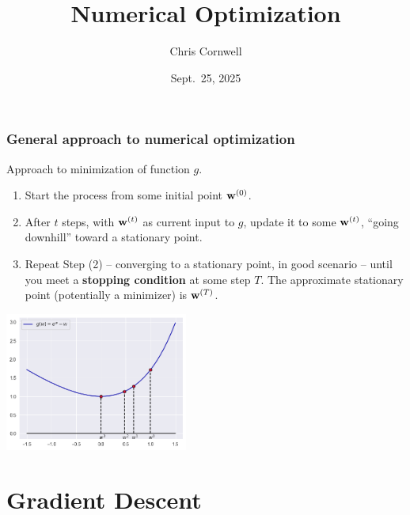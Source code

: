 \documentclass{beamer}
\author{Chris Cornwell}
\date{Sept.~25, 2025}
\title{Numerical Optimization}
\theoremstyle{example}
\begin{document}
\begin{frame}
\titlepage
\end{frame}

\begin{frame}
\frametitle{General approach to numerical optimization}
    Approach to minimization of function $g$. 

    \pause
    \begin{enumerate}
        \item Start the process from some initial point ${\bf w}^{(0)}$.
        \pause
        \item After $t$ steps, with ${\bf w}^{(t)}$ as current input to $g$, update it to some ${\bf w}^{(t)}$, ``going downhill'' toward a stationary point. 
        \pause
        \item Repeat Step (2) {--} converging to a stationary point, in good scenario {--} until you meet a \textbf{stopping condition} at some step $T$. The approximate stationary point (potentially a minimizer) is ${\bf w}^{(T)}$.
    \end{enumerate}
    
    \centering 
    \includegraphics[width=0.45\textwidth]{../../Images/going-downhill.png}
\end{frame}

\section{Gradient Descent}
\end{document}
